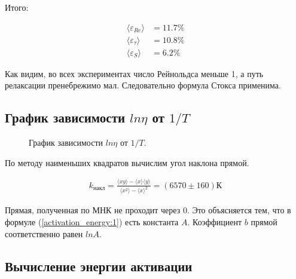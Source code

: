 \documentclass[a4paper, 12pt]{article}
\begin{document}
    Итого:

    \begin{align*}
        \langle \varepsilon_{Re} \rangle &= 11.7\% \\
        \langle \varepsilon_{\tau} \rangle &= 10.8\% \\
        \langle \varepsilon_S \rangle &= 6.2\%
    \end{align*}

    Как видим, во всех экспериментах число Рейнольдса меньше 1, а путь релаксации пренебрежимо мал. Следовательно формула Стокса применима.

    \subsection{График зависимости $ln \eta$ от $1/T$}

    \begin{figure}[ht]
        \caption{График зависимости $ln \eta$ от $1/T$.}
        \label{graph}
    \end{figure}

    По методу наименьших квадратов вычислим угол наклона прямой.

    \begin{align*}
        k_{накл} = \frac{\langle xy \rangle - \langle x \rangle \langle y \rangle}{\langle x^2 \rangle - \langle x \rangle^2} = (6570 \pm 160) К
    \end{align*}

    Прямая, полученная по МНК не проходит через 0. Это объясняется тем, что в формуле (\ref{activation_energy:1}) есть константа $A$. Коэффициент $b$ прямой соответственно равен $lnA$.

    \subsection{Вычисление энергии активации}
\end{document}
